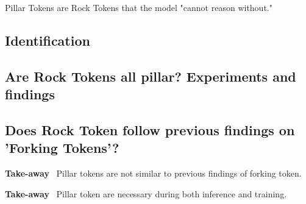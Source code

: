 Pillar Tokens are Rock Tokens that the model "cannot reason without." 

\subsection{Identification}

\subsection{Are Rock Tokens all pillar? Experiments and findings}

\subsection{Does Rock Token follow previous findings on 'Forking Tokens'?}



\begin{takeaway}
\textcolor{tabblue}{\textbf{Take-away}}~
Pillar tokens are not similar to previous findings of forking token.
\end{takeaway}

\begin{takeaway}
\textcolor{tabblue}{\textbf{Take-away}}~
Pillar token are necessary during both inference and training. 
\end{takeaway}